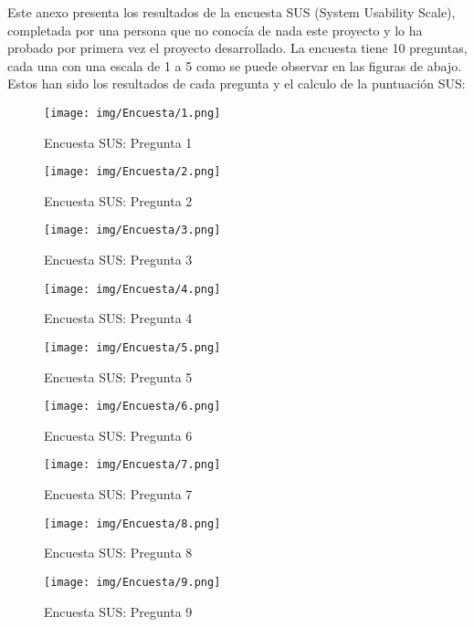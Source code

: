 Este anexo presenta los resultados de la encuesta SUS (System Usability Scale), completada por una persona que no conocía de nada este proyecto y lo ha probado por primera vez el proyecto desarrollado. La encuesta tiene 10 preguntas, cada una con una escala de 1 a 5 como se puede observar en las figuras de abajo. Estos han sido los resultados de cada pregunta y el calculo de la puntuación SUS:

\begin{figure}[h]
\centering
\texttt{[image: img/Encuesta/1.png]}
\caption{Encuesta SUS: Pregunta 1}
\label{fig:1}
\end{figure}

\begin{figure}[h]
\centering
\texttt{[image: img/Encuesta/2.png]}
\caption{Encuesta SUS: Pregunta 2}
\label{fig:2}
\end{figure}

\begin{figure}[h]
\centering
\texttt{[image: img/Encuesta/3.png]}
\caption{Encuesta SUS: Pregunta 3}
\label{fig:3}
\end{figure}

\begin{figure}[h]
\centering
\texttt{[image: img/Encuesta/4.png]}
\caption{Encuesta SUS: Pregunta 4}
\label{fig:4}
\end{figure}

\begin{figure}[h]
\centering
\texttt{[image: img/Encuesta/5.png]}
\caption{Encuesta SUS: Pregunta 5}
\label{fig:5}
\end{figure}

\begin{figure}[h]
\centering
\texttt{[image: img/Encuesta/6.png]}
\caption{Encuesta SUS: Pregunta 6}
\label{fig:6}
\end{figure}

\begin{figure}[h]
\centering
\texttt{[image: img/Encuesta/7.png]}
\caption{Encuesta SUS: Pregunta 7}
\label{fig:7}
\end{figure}

\begin{figure}[h]
\centering
\texttt{[image: img/Encuesta/8.png]}
\caption{Encuesta SUS: Pregunta 8}
\label{fig:8}
\end{figure}

\begin{figure}[h]
\centering
\texttt{[image: img/Encuesta/9.png]}
\caption{Encuesta SUS: Pregunta 9}
\label{fig:9}
\end{figure}


